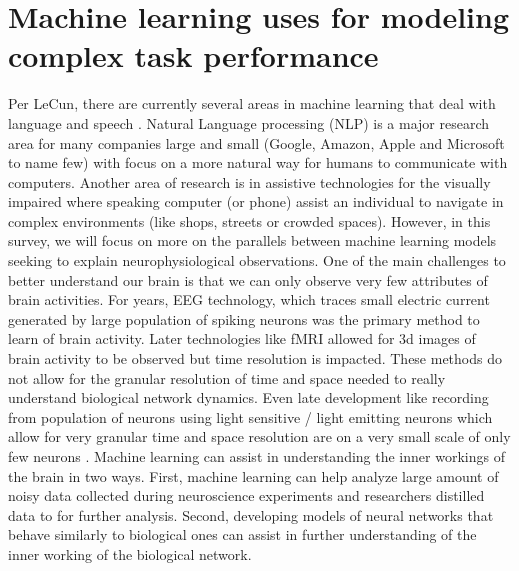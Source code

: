 \documentclass[draft,12pt,oneside]{CUNY_PhD}
\begin{document}
\section{Machine learning uses for modeling complex task performance}
Per LeCun, there are currently several areas in machine learning that deal with language and speech \cite{13}. Natural Language processing (NLP) is a major research area for many companies large and small (Google, Amazon, Apple and Microsoft to name few) with focus on a more natural way for humans to communicate with computers. Another area of research is in assistive technologies for the visually impaired where speaking computer (or phone) assist an individual to navigate in complex environments (like shops, streets or crowded spaces). However, in this survey, we will focus on more on the parallels between machine learning models seeking to explain neurophysiological observations. 
One of the main challenges to better understand our brain is that we can only observe very few attributes of brain activities. For years, EEG technology, which traces small electric current generated by large population of spiking neurons was the primary method to learn of brain activity. Later technologies like fMRI allowed for 3d images of brain activity to be observed but time resolution is impacted. These methods do not allow for the granular resolution of time and space needed to really understand biological network dynamics. Even late development like recording from population of neurons using light sensitive / light emitting neurons which allow for very granular time and space resolution are on a very small scale of only few neurons \cite{22}.
Machine learning can assist in understanding the inner workings of the brain in two ways. First, machine learning can help analyze large amount of noisy data collected during neuroscience experiments and researchers distilled data to for further analysis. Second, developing models of neural networks that behave similarly to biological ones can assist in further understanding of the inner working of the biological network.
\end{document}
